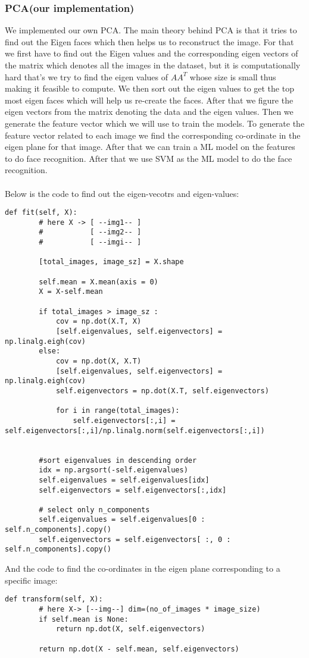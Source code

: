 \subsubsection{PCA(our implementation)}
We implemented our own PCA. The main theory behind PCA is that it tries to find out the Eigen faces which then helps us to reconstruct the image. For that we first have to find out the Eigen values and the corresponding eigen vectors of the matrix which denotes all the images in the dataset, but it is computationally hard that's we try to find the eigen values of $AA^T$ whose size is small thus making it feasible to compute. We then sort out the eigen values to get the top most eigen faces which will help us re-create the faces. After that we figure the eigen vectors from the matrix denoting the data and the eigen values. Then we generate the feature vector which we will use to train the models. To generate the feature vector related to each image we find the corresponding co-ordinate in the eigen plane for that image. After that we can train a ML model on the features to do face recognition. After that we use SVM as the ML model to do the face recognition.\\ \\
Below is the code to find out the eigen-vecotrs and eigen-values:
\newpage
    \begin{lstlisting}[style=Python]
    def fit(self, X):
        # here X -> [ --img1-- ]      
        #           [ --img2-- ]          
        #           [ --imgi-- ]       
    
        [total_images, image_sz] = X.shape
        
        self.mean = X.mean(axis = 0)
        X = X-self.mean

        if total_images > image_sz :
            cov = np.dot(X.T, X)
            [self.eigenvalues, self.eigenvectors] = np.linalg.eigh(cov)
        else:
            cov = np.dot(X, X.T)
            [self.eigenvalues, self.eigenvectors] = np.linalg.eigh(cov)
            self.eigenvectors = np.dot(X.T, self.eigenvectors)

            for i in range(total_images):
                self.eigenvectors[:,i] = self.eigenvectors[:,i]/np.linalg.norm(self.eigenvectors[:,i])
            

        #sort eigenvalues in descending order
        idx = np.argsort(-self.eigenvalues)
        self.eigenvalues = self.eigenvalues[idx]
        self.eigenvectors = self.eigenvectors[:,idx]
        
        # select only n_components
        self.eigenvalues = self.eigenvalues[0 : self.n_components].copy()
        self.eigenvectors = self.eigenvectors[ :, 0 : self.n_components].copy()
\end{lstlisting}
And the code to find the co-ordinates in the eigen plane corresponding to a specific image:
    \begin{lstlisting}[style=Python]
    def transform(self, X):
        # here X-> [--img--] dim=(no_of_images * image_size)
        if self.mean is None:
            return np.dot(X, self.eigenvectors)

        return np.dot(X - self.mean, self.eigenvectors)
    \end{lstlisting}

